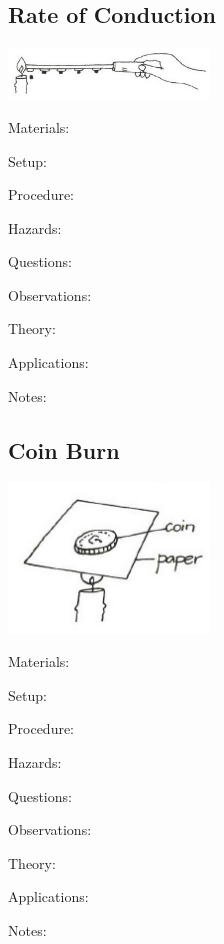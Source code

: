 \begin{multicols}{2}
\subsection{Rate of Conduction}

\begin{center}
\includegraphics[width=0.4\textwidth]{./img/vso/conduction-rate.png}
\end{center}

\begin{description*}
\item[Materials:]{}
\item[Setup:]{}
\item[Procedure:]{}
\item[Hazards:]{}
\item[Questions:]{}
\item[Observations:]{}
\item[Theory:]{}
\item[Applications:]{}
\item[Notes:]{}
\end{description*}

\subsection{Coin Burn}

\begin{center}
\includegraphics[width=0.4\textwidth]{./img/vso/coin-burn.png}
\end{center}

\begin{description*}
\item[Materials:]{}
\item[Setup:]{}
\item[Procedure:]{}
\item[Hazards:]{}
\item[Questions:]{}
\item[Observations:]{}
\item[Theory:]{}
\item[Applications:]{}
\item[Notes:]{}
\end{description*}


\end{multicols}
